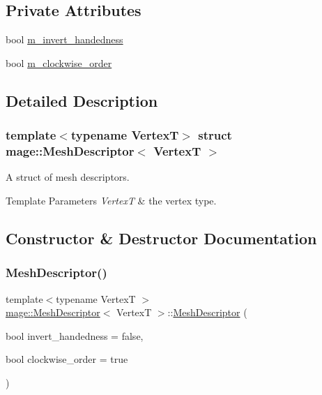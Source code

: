 \subsection*{Private Attributes}
\begin{DoxyCompactItemize}
\item 
bool \hyperlink{structmage_1_1_mesh_descriptor_af7b8124e44ac65ca2088d5d8ca0639f5}{m\+\_\+invert\+\_\+handedness}
\item 
bool \hyperlink{structmage_1_1_mesh_descriptor_a7e769c8d1d81b3514b951b306865dc88}{m\+\_\+clockwise\+\_\+order}
\end{DoxyCompactItemize}


\subsection{Detailed Description}
\subsubsection*{template$<$typename VertexT$>$\newline
struct mage\+::\+Mesh\+Descriptor$<$ Vertex\+T $>$}

A struct of mesh descriptors.


\begin{DoxyTemplParams}{Template Parameters}
{\em VertexT} & the vertex type. \\
\hline
\end{DoxyTemplParams}


\subsection{Constructor \& Destructor Documentation}
\hypertarget{structmage_1_1_mesh_descriptor_ae9c4651675fc0600fca01f0614c70762}{}\label{structmage_1_1_mesh_descriptor_ae9c4651675fc0600fca01f0614c70762} 
\subsubsection{\texorpdfstring{Mesh\+Descriptor()}{MeshDescriptor()}\hspace{0.1cm}{\footnotesize\ttfamily [1/3]}}
{\footnotesize\ttfamily template$<$typename VertexT $>$ \\
\hyperlink{structmage_1_1_mesh_descriptor}{mage\+::\+Mesh\+Descriptor}$<$ VertexT $>$\+::\hyperlink{structmage_1_1_mesh_descriptor}{Mesh\+Descriptor} (\begin{DoxyParamCaption}\item[{bool}]{invert\+\_\+handedness = {\ttfamily false},  }\item[{bool}]{clockwise\+\_\+order = {\ttfamily true} }\end{DoxyParamCaption})\hspace{0.3cm}{\ttfamily [explicit]}}

